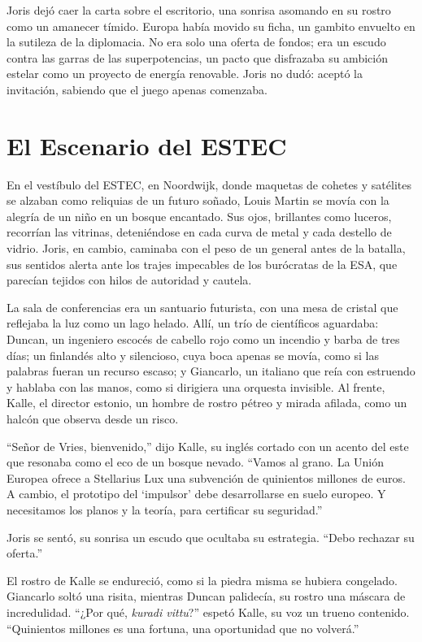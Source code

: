 Joris dejó caer la carta sobre el escritorio, una sonrisa asomando en su rostro como un amanecer tímido. Europa había movido su ficha, un gambito envuelto en la sutileza de la diplomacia. No era solo una oferta de fondos; era un escudo contra las garras de las superpotencias, un pacto que disfrazaba su ambición estelar como un proyecto de energía renovable. Joris no dudó: aceptó la invitación, sabiendo que el juego apenas comenzaba.

\section{El Escenario del ESTEC}
\label{sec:escenario-estec}

En el vestíbulo del ESTEC, en Noordwijk, donde maquetas de cohetes y satélites se alzaban como reliquias de un futuro soñado, Louis Martin se movía con la alegría de un niño en un bosque encantado. Sus ojos, brillantes como luceros, recorrían las vitrinas, deteniéndose en cada curva de metal y cada destello de vidrio. Joris, en cambio, caminaba con el peso de un general antes de la batalla, sus sentidos alerta ante los trajes impecables de los burócratas de la ESA, que parecían tejidos con hilos de autoridad y cautela.

La sala de conferencias era un santuario futurista, con una mesa de cristal que reflejaba la luz como un lago helado. Allí, un trío de científicos aguardaba: Duncan, un ingeniero escocés de cabello rojo como un incendio y barba de tres días; un finlandés alto y silencioso, cuya boca apenas se movía, como si las palabras fueran un recurso escaso; y Giancarlo, un italiano que reía con estruendo y hablaba con las manos, como si dirigiera una orquesta invisible. Al frente, Kalle, el director estonio, un hombre de rostro pétreo y mirada afilada, como un halcón que observa desde un risco.

“Señor de Vries, bienvenido,” dijo Kalle, su inglés cortado con un acento del este que resonaba como el eco de un bosque nevado. “Vamos al grano. La Unión Europea ofrece a Stellarius Lux una subvención de quinientos millones de euros. A cambio, el prototipo del ‘impulsor’ debe desarrollarse en suelo europeo. Y necesitamos los planos y la teoría, para certificar su seguridad.”

Joris se sentó, su sonrisa un escudo que ocultaba su estrategia. “Debo rechazar su oferta.”

El rostro de Kalle se endureció, como si la piedra misma se hubiera congelado. Giancarlo soltó una risita, mientras Duncan palidecía, su rostro una máscara de incredulidad. “¿Por qué, \emph{kuradi vittu}?” espetó Kalle, su voz un trueno contenido. “Quinientos millones es una fortuna, una oportunidad que no volverá.”

